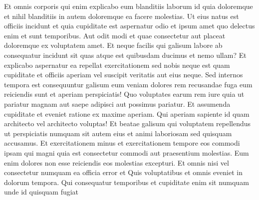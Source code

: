 \documentclass[a4paper,12pt]{report}
\begin{document}
\par Et omnis corporis qui enim explicabo eum blanditiis laborum id quia doloremque et nihil blanditiis in autem doloremque ea facere molestias. Ut eius natus est officiis incidunt et quia cupiditate est aspernatur odio et ipsum amet quo delectus enim et sunt temporibus. Aut odit modi et quae consectetur aut placeat doloremque ex voluptatem amet. Et neque facilis qui galisum labore ab consequatur incidunt sit quas atque est quibusdam ducimus et nemo ullam? Et explicabo aspernatur ea repellat exercitationem sed nobis neque est quam cupiditate et officiis aperiam vel suscipit veritatis aut eius neque. Sed internos tempora est consequuntur galisum eum veniam dolores rem recusandae fuga eum reiciendis sunt et aperiam perspiciatis! Quo voluptates earum rem iure quia ut pariatur magnam aut saepe adipisci aut possimus pariatur. Et assumenda cupiditate et eveniet ratione ex maxime aperiam. Qui aperiam sapiente id quam architecto vel architecto voluptas! Et beatae galisum qui voluptatem repellendus ut perspiciatis numquam sit autem eius et animi laboriosam sed quisquam accusamus. Et exercitationem minus et exercitationem tempore eos commodi ipsam qui magni quia est consectetur commodi aut praesentium molestias. Eum enim dolores non esse reiciendis eos molestias excepturi. Et omnis nisi vel consectetur numquam ea officia error et Quis voluptatibus et omnis eveniet in dolorum tempora. Qui consequatur temporibus et cupiditate enim sit numquam unde id quisquam fugiat
\end{document}
